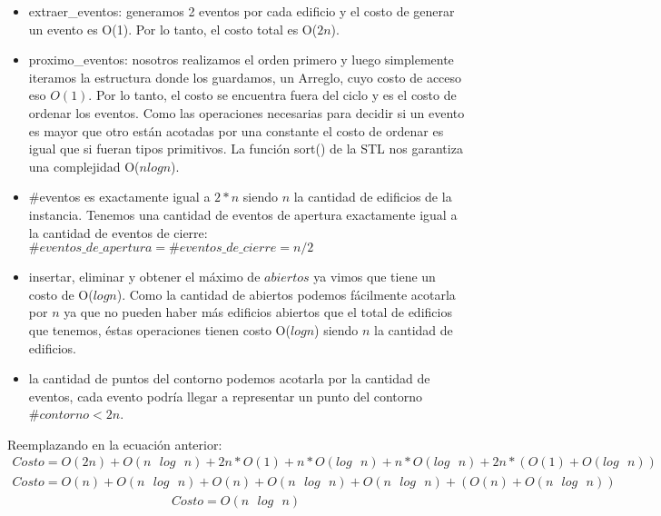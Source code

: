 \begin{itemize}
	\item extraer\_eventos: generamos 2 eventos por cada edificio y el costo
	de generar un evento es O(1). Por lo tanto, el costo total es O($2n$).
	\item proximo\_eventos: nosotros realizamos el orden primero y luego simplemente iteramos
	la estructura donde los guardamos, un Arreglo, cuyo costo de acceso eso $O(1)$. Por lo
	tanto, el costo se encuentra fuera del ciclo y es el costo de ordenar los eventos. Como
	las operaciones necesarias para decidir si un evento es mayor que otro están acotadas
	por una constante el costo de ordenar es igual que si fueran tipos primitivos. La función
	sort() de la STL nos garantiza una complejidad O($n log n$).
	\item \#eventos es exactamente igual a $2*n$ siendo $n$ la cantidad de edificios
	de la instancia. Tenemos una cantidad de eventos de apertura exactamente igual a la 
	cantidad de eventos de cierre: $\#eventos\_de\_apertura = \#eventos\_de\_cierre = n/2$
	\item insertar, eliminar y obtener el máximo de $abiertos$ ya vimos que tiene un costo
	de O($log n$). Como la cantidad de abiertos podemos fácilmente acotarla por $n$ ya que
	no pueden haber más edificios abiertos que el total de edificios que tenemos, éstas
	operaciones tienen costo O($log n$) siendo $n$ la cantidad de edificios.
	\item la cantidad de puntos del contorno podemos acotarla por la cantidad de eventos,
	cada evento podría llegar a representar un punto del contorno $\#contorno < 2n$.
\end{itemize}
Reemplazando en la ecuación anterior:
\begin{equation}
\begin{split}
	Costo = O(2n) + O(n\text{ }log\text{ } n) + 2n * O(1) + n * O(log\text{ } n) + n * O(log\text{ } n) + 2n * (O(1) + O(log\text{ } n))
\end{split}
\end{equation}
\begin{equation}
\begin{split}
	Costo = O(n) + O(n\text{ }log\text{ } n) + O(n) + O(n\text{ }log\text{ } n) + O(n\text{ }log\text{ } n) + (O(n) + O(n\text{ }log\text{ } n))
\end{split}
\end{equation}
\begin{equation}
\begin{split}
	Costo = O(n\text{ }log\text{ }n)
\end{split}
\end{equation}
